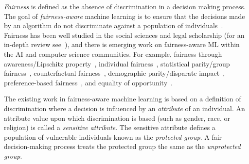 \documentclass[11pt]{article}
\begin{document}
\emph{Fairness} is defined as the absence of discrimination in a decision making process. The goal of \emph{fairness-aware} machine learning is to ensure that the decisions made by an algorithm do not discriminate against a population of individuals~\cite{feldman2015certifying2,boyd2014networked,hardt2016equality3}. Fairness has been well studied in the social sciences and legal scholarship (for an in-depth review see~\cite{barocas2016big2}), and there is emerging work on fairness-aware ML within the AI and computer science communities. For example, fairness through awareness/Lipschitz property~\cite{dwork2012fairness3}, individual fairness~\cite{zemel2013learning}, statistical parity/group fairness~\cite{kamishima2011fairness}, counterfactual fairness~\cite{counterfactualfairness}, demographic parity/disparate impact~\cite{feldman2015certifying2,chouldechova2017fair2}, preference-based fairness~\cite{zafar2017parity}, and equality of opportunity~\cite{hardt2016equality3}.

The existing work in fairness-aware machine learning is based on a definition of discrimination where a decision is influenced by an \emph{attribute} of an individual. An attribute value upon which discrimination is based (such as gender, race, or religion) is called a \emph{sensitive attribute}. The sensitive attribute defines a population of vulnerable individuals known as the \emph{protected group}. A fair decision-making process treats the protected group the same as the \emph{unprotected group}. 
\end{document}
